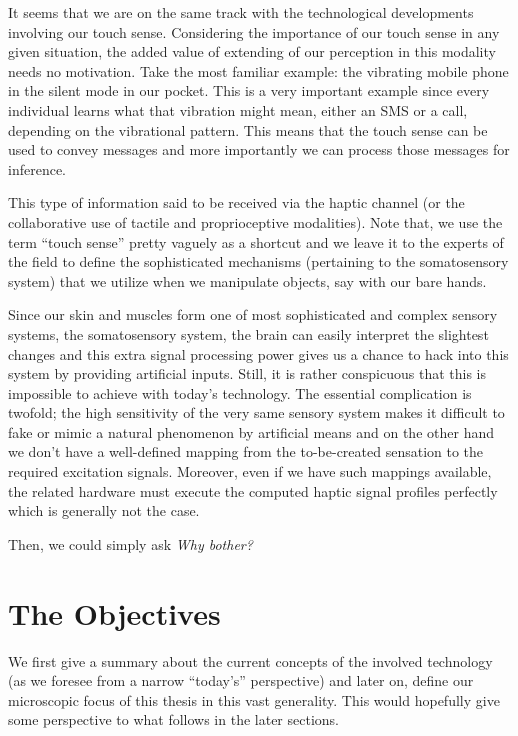 It seems that we are on the same track with the technological developments involving our touch sense. Considering the importance of our touch sense in any given situation, the added value of extending of our perception in this modality needs no motivation. Take the most familiar example: the vibrating mobile phone in the silent mode in our pocket. This is a very important example since every individual learns what that vibration might mean, either an SMS or a call, depending on the vibrational pattern. This means that the touch sense can be used to convey messages and more importantly we can process those messages for inference. 


This type of information said to be received via the haptic channel (or the collaborative use of tactile and proprioceptive modalities). Note that, we use the term ``touch sense'' pretty vaguely as a shortcut and we leave it to the experts of the field to define the sophisticated mechanisms (pertaining to the somatosensory system) that we utilize when we manipulate objects, say with our bare hands. 


Since our skin and muscles form one of most sophisticated and complex sensory systems, the somatosensory system, the brain can easily interpret the slightest changes and this extra signal processing power gives us a chance to hack into this system by providing artificial inputs. Still, it is rather conspicuous that this is impossible to achieve with today's technology. The essential complication is twofold; the high sensitivity of the very same sensory system makes it difficult to fake or mimic a natural phenomenon by artificial means and on the other hand we don't have a well-defined mapping from the to-be-created sensation to the required excitation signals. Moreover, even if we have such mappings available, the related hardware must execute the computed haptic signal profiles perfectly which is generally not the case.

Then, we could simply ask \emph{Why bother?} 


\section{The Objectives}

We first give a summary about the current concepts of the involved technology (as we foresee from a narrow ``today's'' perspective) and later on, define our microscopic focus of this thesis in this vast generality. This would hopefully give some perspective to what follows in the later sections.  


